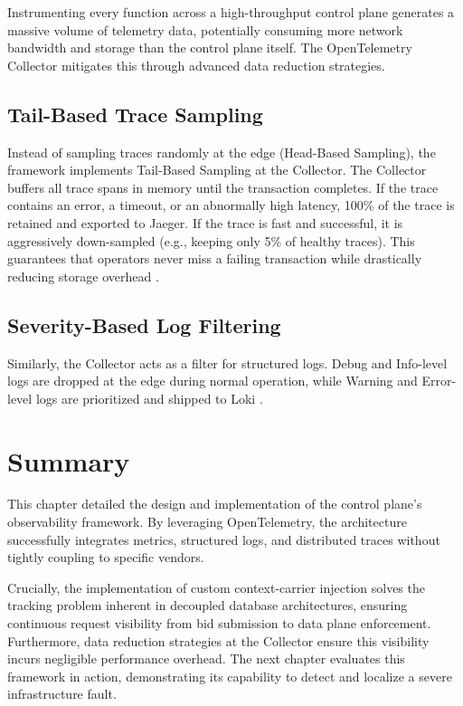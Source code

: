 Instrumenting every function across a high-throughput control plane generates a massive volume of telemetry data, potentially consuming more network bandwidth and storage than the control plane itself. The OpenTelemetry Collector mitigates this through advanced data reduction strategies.

\subsection{Tail-Based Trace Sampling}
Instead of sampling traces randomly at the edge (Head-Based Sampling), the framework implements Tail-Based Sampling \cite{chaiTraceCollectionOptimization2021} at the Collector. The Collector buffers all trace spans in memory until the transaction completes. If the trace contains an error, a timeout, or an abnormally high latency, 100\% of the trace is retained and exported to Jaeger. If the trace is fast and successful, it is aggressively down-sampled (e.g., keeping only 5\% of healthy traces). This guarantees that operators never miss a failing transaction while drastically reducing storage overhead \cite{opentelemetryCollectorScaling}.

\subsection{Severity-Based Log Filtering}
Similarly, the Collector \cite{opentelemetryCollectorConfigurationLocation} acts as a filter for structured logs. Debug and Info-level logs are dropped at the edge during normal operation, while Warning and Error-level logs are prioritized and shipped to Loki \cite{bressoudDistributedSystemsMonitoring2018}. 

\section{Summary}

This chapter detailed the design and implementation of the control plane's observability framework. By leveraging OpenTelemetry, the architecture successfully integrates metrics, structured logs, and distributed traces without tightly coupling to specific vendors. 

Crucially, the implementation of custom context-carrier injection solves the tracking problem inherent in decoupled database architectures, ensuring continuous request visibility from bid submission to data plane enforcement. Furthermore, data reduction strategies at the Collector ensure this visibility incurs negligible performance overhead. The next chapter evaluates this framework in action, demonstrating its capability to detect and localize a severe infrastructure fault.